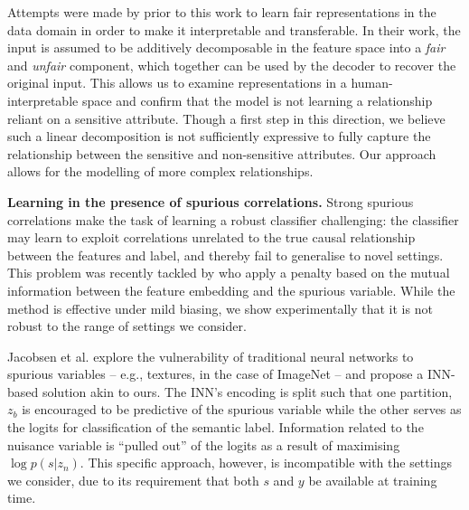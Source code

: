 Attempts were made by \cite{QuaShaTho19} prior to this work to learn fair representations in the data domain in order to make it interpretable and transferable.
In their work, the input is assumed to be additively decomposable in the feature space into a \emph{fair} and \emph{unfair} component, which together can be used by the decoder to recover the original input.
This allows us to examine representations in a human-interpretable space and confirm that the model is not learning a relationship reliant on a sensitive attribute.
Though a first step in this direction, we believe such a linear decomposition is not sufficiently expressive to fully capture the relationship between the sensitive and non-sensitive attributes.
Our approach allows for the modelling of more complex relationships.

\textbf{Learning in the presence of spurious correlations.}
Strong spurious correlations make the task of learning a robust classifier challenging: the classifier may learn to exploit correlations unrelated to the true causal relationship between the features and label, and thereby fail to generalise to novel settings.
This problem was recently tackled by \cite{ln2l} who apply a penalty based on the mutual information between the feature embedding and the spurious variable. 
While the method is effective under mild biasing, we show experimentally that it is not robust to the range of settings we consider.

Jacobsen et al. \cite{JacBehZemBet19} explore the vulnerability of traditional neural networks to spurious variables -- e.g., textures, in the case of ImageNet \cite{Geir18} -- and propose a INN-based solution akin to ours.
The INN's encoding is split such that one partition, $z_b$ is encouraged to be predictive of the spurious variable while the other serves as the logits for classification of the semantic label. 
Information related to the nuisance variable is ``pulled out'' of the logits as a result of maximising $\log p(s|z_n)$.
This specific approach, however, is incompatible with the settings we consider, due to its requirement that both $s$ and $y$ be available at training time.

